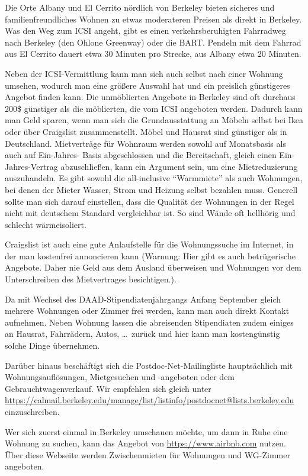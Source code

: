 \documentclass[a4paper]{scrreprt}
\begin{document}
Die Orte Albany und El Cerrito nördlich von Berkeley bieten sicheres
und familienfreundliches Wohnen zu etwas moderateren Preisen als
direkt in Berkeley. Was den Weg zum ICSI angeht, gibt es einen
verkehrsberuhigten Fahrradweg nach Berkeley (den Ohlone Greenway) oder
die BART. Pendeln mit dem Fahrrad aus El Cerrito dauert etwa 30
Minuten pro Strecke, aus Albany etwa 20 Minuten.

Neben der ICSI-Vermittlung kann man sich auch selbst nach einer
Wohnung umsehen, wodurch man eine größere Auswahl hat und ein
preislich günstigeres Angebot finden kann. Die unmöblierten Angebote
in Berkeley sind oft durchaus 200\$ günstiger als die möblierten, die
vom ICSI angeboten werden. Dadurch kann man Geld sparen, wenn man sich
die Grundausstattung an Möbeln selbst bei Ikea oder über Craigslist
zusammenstellt. Möbel und Hausrat sind günstiger als in
Deutschland. Mietverträge für Wohnraum werden sowohl auf Monatsbasis
als auch auf Ein-Jahres- Basis abgeschlossen und die Bereitschaft,
gleich einen Ein-Jahres-Vertrag abzuschließen, kann ein Argument sein,
um eine Mietreduzierung auszuhandeln. Es gibt sowohl die all-inclusive
"`Warmmiete"' als auch Wohnungen, bei denen der Mieter Wasser, Strom
und Heizung selbst bezahlen muss. Generell sollte man sich darauf
einstellen, dass die Qualität der Wohnungen in der Regel nicht mit
deutschem Standard vergleichbar ist. So sind Wände oft hellhörig und
schlecht wärmeisoliert.

Craigslist ist auch eine gute Anlaufstelle für die Wohnungssuche im
Internet, in der man kostenfrei annoncieren kann (Warnung: Hier gibt
es auch betrügerische Angebote. Daher nie Geld aus dem Ausland
überweisen und Wohnungen vor dem Unterschreiben des Mietvertrages
besichtigen.).

Da mit Wechsel des DAAD-Stipendiatenjahrgangs Anfang September gleich
mehrere Wohnungen oder Zimmer frei werden, kann man auch direkt
Kontakt aufnehmen. Neben Wohnung lassen die abreisenden Stipendiaten
zudem einiges an Hausrat, Fahrrädern, Autos, \dots\ zurück und hier kann
man kostengünstig solche Dinge übernehmen.

Darüber hinaus beschäftigt sich die Postdoc-Net-Mailingliste
hauptsächlich mit Wohnungsauflösungen, Mietgesuchen und -angeboten
oder dem Gebrauchtwagenverkauf. Wir empfehlen sich gleich unter
\url{https://calmail.berkeley.edu/manage/list/listinfo/postdocnet@lists.berkeley.edu}
einzuschreiben.

Wer sich zuerst einmal in Berkeley umschauen möchte, um dann in Ruhe
eine Wohnung zu suchen, kann das Angebot von
\url{https://www.airbnb.com} nutzen. Über diese Webseite werden 
Zwischenmieten für Wohnungen und WG-Zimmer angeboten. 
\end{document}
